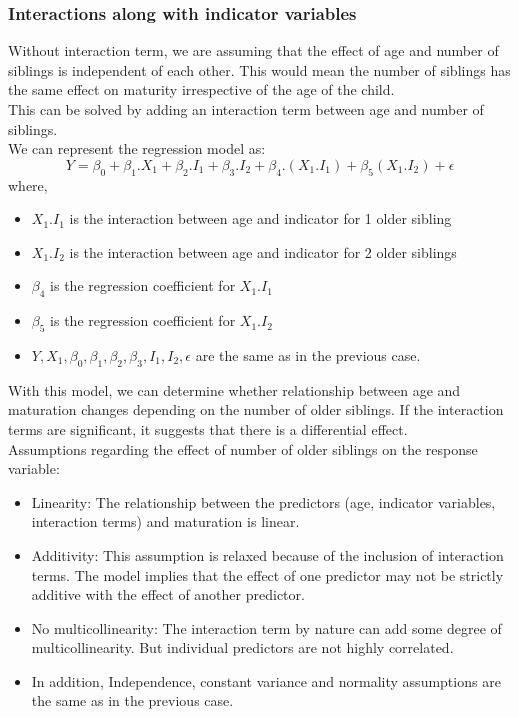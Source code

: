 \documentclass[12pt]{article}
\begin{document}
\subsubsection*{Interactions along with indicator variables}
Without interaction term, we are assuming that the effect of age and number
of siblings is independent of each other. This would mean the number of siblings
has the same effect on maturity irrespective of the age of the child.
\\
This can be solved by adding an interaction term between age and number of siblings.
\\[\baselineskip]
We can represent the regression model as:
\[Y = \beta_0 + \beta_1. X_1 + \beta_2. I_1 + \beta_3. I_2 + \beta_4.(X_1.I_1) + \beta_5(X_1.I_2) + \epsilon\]
where,
\begin{itemize}
    \item \(X_1.I_1\) is the interaction between age and indicator for 1 older sibling
    \item \(X_1.I_2\) is the interaction between age and indicator for 2 older siblings
    \item \(\beta_4\) is the regression coefficient for \(X_1.I_1\)
    \item \(\beta_5\) is the regression coefficient for \(X_1.I_2\)
    \item \(Y, X_1, \beta_0, \beta_1, \beta_2, \beta_3, I_1, I_2, \epsilon\) are the
    same as in the previous case.
\end{itemize}
With this model, we can determine whether relationship between age and maturation
changes depending on the number of older siblings. If the interaction terms are
significant, it suggests that there is a differential effect.
\\[\baselineskip]
Assumptions regarding the effect of number of older siblings on the response variable:
\begin{itemize}
    \item Linearity: The relationship between the predictors (age, indicator variables,
    interaction terms) and maturation is linear.
    \item Additivity: This assumption is relaxed because of the inclusion of
    interaction terms. The model implies that the effect of one predictor may
    not be strictly additive with the effect of another predictor.
    \item No multicollinearity: The interaction term by nature can add some degree
    of multicollinearity. But individual predictors are not highly correlated.
    \item In addition, Independence, constant variance and normality assumptions
    are the same as in the previous case.
\end{itemize}
\end{document}
